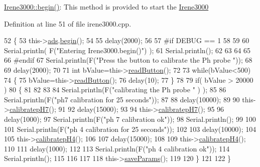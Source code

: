 \hyperlink{class_irene3000_ad5891806c500ae1007afe52b9e304c2b}{Irene3000\+::begin()}\+: This method is provided to start the \hyperlink{class_irene3000}{Irene3000} 

Definition at line 51 of file irene3000.\+cpp.


\begin{DoxyCode}
52 \{
53     this->\hyperlink{class_irene3000_a1215e77ba761c9908d80d691f149e135}{ads}.\hyperlink{class_adafruit___a_d_s1015_a6eba7c3cd854927f60883bb371e5faa6}{begin}();
54 
55     delay(2000);
56 
57 \textcolor{preprocessor}{#if DEBUG == 1 }
58 
59 
60     Serial.println( F(\textcolor{stringliteral}{"Entering Irene3000.begin()"}) );
61     Serial.println();
62     
63     
64     
65 
66 \textcolor{preprocessor}{#endif}
67     Serial.println(F(\textcolor{stringliteral}{"Press the button to calibrate the Ph probe "}));
68 
69     delay(2000);
70 
71     \textcolor{keywordtype}{int} bValue=this->\hyperlink{class_irene3000_a78a87eb7cf295b95c12b2ebd51c2bb77}{readButton}();
72     
73     \textcolor{keywordflow}{while}(bValue<500)
74     \{
75         bValue=this->\hyperlink{class_irene3000_a78a87eb7cf295b95c12b2ebd51c2bb77}{readButton}();
76         delay(10);  
77     \}
78 
79     \textcolor{keywordflow}{if}(  bValue > 20000 )
80     \{
81     
82 
83         
84         Serial.println(F(\textcolor{stringliteral}{"calibrating the Ph probe "} ) );
85         
86         Serial.println(F(\textcolor{stringliteral}{"ph7 calibration for 25 seconds"}));
87         
88         delay(10000);
89         
90         this->\hyperlink{class_irene3000_a1d3299202e4cb7afcff9c9e3e95d94c1}{calibratepH7}();
91 
92         delay(15000);       
93     
94         this->\hyperlink{class_irene3000_a1d3299202e4cb7afcff9c9e3e95d94c1}{calibratepH7}();
95 
96         delay(1000);
97         Serial.println(F(\textcolor{stringliteral}{"ph 7 calibration ok"}));
98         Serial.println();
99     
100 
101         Serial.println(F(\textcolor{stringliteral}{"ph 4 calibration for 25 seconds"}));
102     
103         delay(10000);       
104 
105         this->\hyperlink{class_irene3000_aa140dd026922a04981edfd04d46cabbe}{calibratepH4}();
106 
107         delay(15000);
108         
109         this->\hyperlink{class_irene3000_aa140dd026922a04981edfd04d46cabbe}{calibratepH4}();
110     
111         delay(1000);        
112 
113         Serial.println(F(\textcolor{stringliteral}{"ph 4 calibration ok"}));
114         Serial.println();
115     
116 
117 
118         this->\hyperlink{class_irene3000_a63dbd38e79b8cd5f1fba4b245501a894}{saveParams}();
119     
120     \}
121 
122 \}
\end{DoxyCode}
